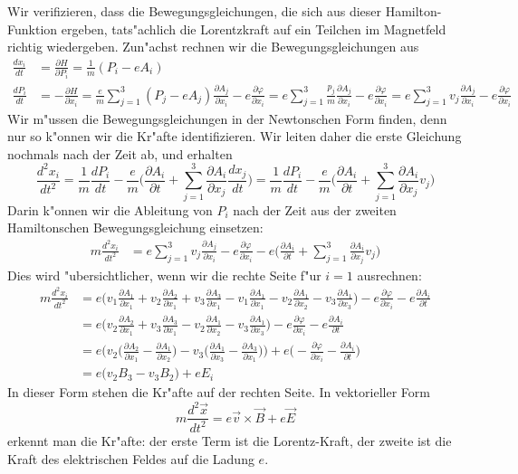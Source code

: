 Wir verifizieren, dass die Bewegungsgleichungen, die sich aus dieser
Hamilton-Funktion ergeben, tats"achlich die Lorentzkraft auf ein
Teilchen im Magnetfeld richtig wiedergeben.
Zun"achst rechnen wir die Bewegungsgleichungen aus
\begin{align*}
\frac{dx_i}{dt}
&=
\frac{\partial H}{\partial P_i}
=
\frac1m(P_i-eA_i)
\\
\frac{dP_i}{dt}
&=
-\frac{\partial H}{\partial x_i}
=
\frac{e}{m}\sum_{j=1}^3( P_j-eA_j)\frac{\partial A_j}{\partial x_i}
-e\frac{\partial\varphi}{\partial x_i}
=
e\sum_{j=1}^3\frac{p_j}{m}\frac{\partial A_j}{\partial x_i}
-e\frac{\partial\varphi}{\partial x_i}
=
e\sum_{j=1}^3v_j\frac{\partial A_j}{\partial x_i}
-e\frac{\partial\varphi}{\partial x_i}
\end{align*}
Wir m"ussen die Bewegungsgleichungen in der Newtonschen Form 
finden, denn nur so k"onnen wir die Kr"afte identifizieren.
Wir leiten daher die erste Gleichung nochmals nach der Zeit ab,
und erhalten
\[
\frac{d^2 x_i}{dt^2}
=
\frac1m\frac{dP_i}{dt}-\frac{e}{m}\biggl(
\frac{\partial A_i}{\partial t}
+\sum_{j=1}^3\frac{\partial A_i}{\partial x_j}\frac{dx_j}{dt}
\biggr)
=
\frac1m\frac{dP_i}{dt}-\frac{e}{m}\biggl(
\frac{\partial A_i}{\partial t}
+
\sum_{j=1}^3\frac{\partial A_i}{\partial x_j}v_j
\biggr)
\]
Darin k"onnen wir die Ableitung von $P_i$ nach der Zeit aus der
zweiten Hamiltonschen Bewegungsgleichung einsetzen:
\begin{align*}
m\frac{d^2 x_i}{dt^2}
&=
e\sum_{j=1}^3v_j\frac{\partial A_j}{\partial x_i}
-e\frac{\partial\varphi}{\partial x_i}
-
e\biggl(
\frac{\partial A_i}{\partial t}
+\sum_{j=1}^3\frac{\partial A_i}{\partial x_j}v_j
\biggr)
\end{align*}
Dies wird "ubersichtlicher, wenn wir die rechte Seite f"ur $i=1$
ausrechnen:
\begin{align*}
m\frac{d^2 x_i}{dt^2}
&=
e\biggl(
v_1\frac{\partial A_1}{\partial x_1}
+
v_2\frac{\partial A_2}{\partial x_1}
+
v_3\frac{\partial A_3}{\partial x_1}
-
v_1\frac{\partial A_1}{\partial x_1}
-
v_2\frac{\partial A_1}{\partial x_2}
-
v_3\frac{\partial A_1}{\partial x_3}
\biggr)
-e\frac{\partial\varphi}{\partial x_i}
-e\frac{\partial A_i}{\partial t}
\\
&=
e\biggl(
v_2\frac{\partial A_2}{\partial x_1}
+
v_3\frac{\partial A_3}{\partial x_1}
-
v_2\frac{\partial A_1}{\partial x_2}
-
v_3\frac{\partial A_1}{\partial x_3}
\biggr)
-e\frac{\partial\varphi}{\partial x_i}
-e\frac{\partial A_i}{\partial t}
\\
&=
e\biggl(
v_2
\biggl(
\frac{\partial A_2}{\partial x_1}
-
\frac{\partial A_1}{\partial x_2}
\biggr)
-
v_3\biggr(
\frac{\partial A_1}{\partial x_3}
-
\frac{\partial A_3}{\partial x_1}
\biggr)
\biggr)
+e\biggl(
-\frac{\partial\varphi}{\partial x_i}
-\frac{\partial A_i}{\partial t}
\biggr)
\\
&=
e\biggl(
v_2B_3
-
v_3B_2
\biggr)
+eE_i
\end{align*}
In dieser Form stehen die Kr"afte auf der rechten Seite. 
In vektorieller Form
\[
m\frac{d^2\vec x}{dt^2}
=
e\vec v\times\vec B
+e\vec E
\]
erkennt man die Kr"afte: der erste Term ist die Lorentz-Kraft,
der zweite ist die Kraft des elektrischen Feldes auf die Ladung $e$.

